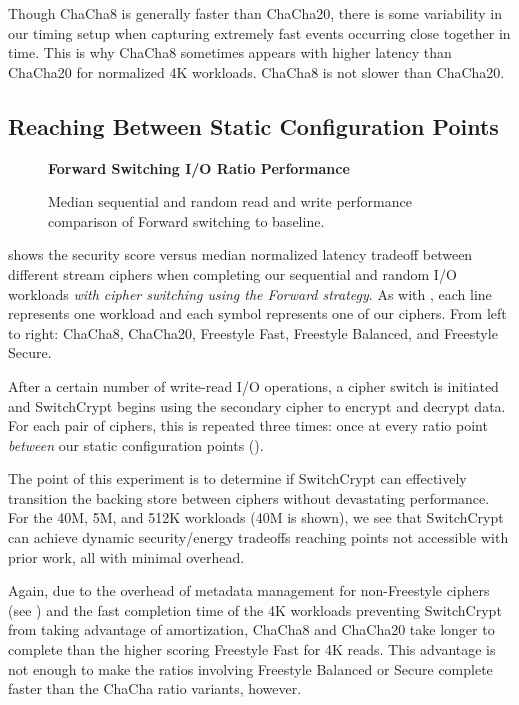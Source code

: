Though ChaCha8 is generally faster than ChaCha20, there is some variability in
our timing setup when capturing extremely fast events occurring close together
in time. This is why ChaCha8 sometimes appears with higher latency than
ChaCha20 for normalized 4K workloads. ChaCha8 is not slower than ChaCha20.

\subsection{Reaching Between Static Configuration Points}\label{subsec:2}

\begin{figure}[ht]
  \textbf{Forward Switching I/O Ratio Performance}\par\medskip
  {} \caption{Median sequential and
  random read and write performance comparison of Forward switching to
  baseline.}
 \label{fig:tradeoff-with-ratios}
\end{figure}

 shows the security score versus median normalized
latency tradeoff between different stream ciphers when completing our sequential
and random I/O workloads \emph{with cipher switching using the Forward
strategy}. As with , each line represents one
workload and each symbol represents one of our ciphers. From left to right:
ChaCha8, ChaCha20, Freestyle Fast, Freestyle Balanced, and Freestyle Secure.

After a certain number of write-read I/O operations, a cipher switch is
initiated and SwitchCrypt begins using the secondary cipher to encrypt and
decrypt data. For each pair of ciphers, this is repeated three times: once at
every ratio point \emph{between} our static configuration points ().

The point of this experiment is to determine if SwitchCrypt can effectively
transition the backing store between ciphers without devastating performance.
For the 40M, 5M, and 512K workloads (40M is shown), we see that SwitchCrypt can
achieve dynamic security/energy tradeoffs reaching points not accessible with
prior work, all with minimal overhead.

Again, due to the overhead of metadata management for non-Freestyle ciphers (see
) and the fast completion time of the 4K workloads
preventing SwitchCrypt from taking advantage of amortization, ChaCha8 and
ChaCha20 take longer to complete than the higher scoring Freestyle Fast for 4K
reads. This advantage is not enough to make the ratios involving Freestyle
Balanced or Secure complete faster than the ChaCha ratio variants, however.


